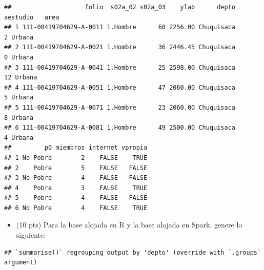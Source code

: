 \documentclass[
]{article}
\newenvironment{Shaded}{\begin{snugshade}}{\end{snugshade}}
\newcommand{\CommentTok}[1]{\textcolor[rgb]{0.56,0.35,0.01}{\textit{#1}}}
\newcommand{\DataTypeTok}[1]{\textcolor[rgb]{0.13,0.29,0.53}{#1}}
\newcommand{\KeywordTok}[1]{\textcolor[rgb]{0.13,0.29,0.53}{\textbf{#1}}}
\newcommand{\NormalTok}[1]{#1}
\newcommand{\OperatorTok}[1]{\textcolor[rgb]{0.81,0.36,0.00}{\textbf{#1}}}
\newcommand{\StringTok}[1]{\textcolor[rgb]{0.31,0.60,0.02}{#1}}
\providecommand{\tightlist}{%
  \setlength{\itemsep}{0pt}\setlength{\parskip}{0pt}}
\begin{document}
\begin{verbatim}
##                    folio  s02a_02 s02a_03    ylab      depto aestudio   area
## 1 111-00419704629-A-0011 1.Hombre      60 2256.00 Chuquisaca        2 Urbana
## 2 111-00419704629-A-0021 1.Hombre      36 2446.45 Chuquisaca        0 Urbana
## 3 111-00419704629-A-0041 1.Hombre      25 2598.00 Chuquisaca       12 Urbana
## 4 111-00419704629-A-0051 1.Hombre      47 2060.00 Chuquisaca        5 Urbana
## 5 111-00419704629-A-0071 1.Hombre      23 2060.00 Chuquisaca        8 Urbana
## 6 111-00419704629-A-0081 1.Hombre      49 2500.00 Chuquisaca        4 Urbana
##         p0 miembros internet vpropia
## 1 No Pobre        2    FALSE    TRUE
## 2    Pobre        5    FALSE   FALSE
## 3 No Pobre        4    FALSE   FALSE
## 4    Pobre        3    FALSE    TRUE
## 5    Pobre        4    FALSE   FALSE
## 6 No Pobre        4    FALSE    TRUE
\end{verbatim}

\begin{itemize}
\tightlist
\item
  (10 pts) Para la base alojada en R y la base alojada en Spark, genere
  lo siguiente:
\end{itemize}

\begin{Shaded}
\end{Shaded}

\begin{verbatim}
## `summarise()` regrouping output by 'depto' (override with `.groups` argument)
\end{verbatim}
\end{document}
